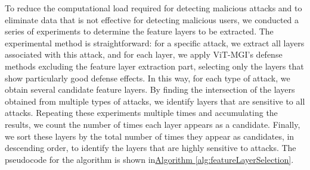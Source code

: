 \documentclass[conference]{IEEEtran}
\begin{document}

To reduce the computational load required for detecting malicious attacks and to eliminate data that is not effective for detecting malicious users, we conducted a series of experiments to determine the feature layers to be extracted. The experimental method is straightforward: for a specific attack, we extract all layers associated with this attack, and for each layer, we apply ViT-MGI's defense methods excluding the feature layer extraction part, selecting only the layers that show particularly good defense effects. In this way, for each type of attack, we obtain several candidate feature layers. By finding the intersection of the layers obtained from multiple types of attacks, we identify layers that are sensitive to all attacks. Repeating these experiments multiple times and accumulating the results, we count the number of times each layer appears as a candidate. Finally, we sort these layers by the total number of times they appear as candidates, in descending order, to identify the layers that are highly sensitive to attacks. The pseudocode for the algorithm is shown in\hyperref[alg:featureLayerSelection]{Algorithm \ref{alg:featureLayerSelection}}.

    
    
    
\end{document}
